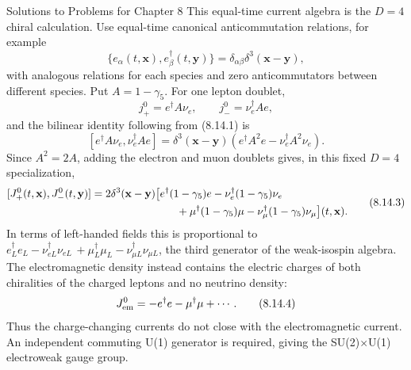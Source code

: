 \begin{bankssolutions}{Solutions to Problems for Chapter 8}
This equal-time current algebra is the $D=4$ chiral calculation.
Use equal-time canonical anticommutation relations, for example
\[
  \{e_\alpha(t,\mathbf x),e_\beta^\dagger(t,\mathbf y)\}
  =\delta_{\alpha\beta}\delta^3(\mathbf x-\mathbf y),
  \tag{8.14.1}
\]
with analogous relations for each species and zero anticommutators between
different species.  Put $A=1-\gamma_5$.  For one lepton doublet,
\[
  j_+^0=e^\dagger A\nu_e,\qquad j_-^0=\nu_e^\dagger A e,
\]
and the bilinear identity following from (8.14.1) is
\[
  [e^\dagger A\nu_e,\nu_e^\dagger A e]
  =\delta^3(\mathbf x-\mathbf y)
  \left(e^\dagger A^2e-\nu_e^\dagger A^2\nu_e\right).
  \tag{8.14.2}
\]
Since $A^2=2A$, adding the electron and muon doublets gives, in this fixed
$D=4$ specialization,
\[
\begin{split}
  [J_+^0(t,\mathbf x),J_-^0(t,\mathbf y)]
  ={}&2\delta^3(\mathbf x-\mathbf y)\bigl[
  e^\dagger(1-\gamma_5)e-\nu_e^\dagger(1-\gamma_5)\nu_e\\
  &\hspace{6.6em}
  +\mu^\dagger(1-\gamma_5)\mu
  -\nu_\mu^\dagger(1-\gamma_5)\nu_\mu\bigr](t,\mathbf x).
\end{split}
  \tag{8.14.3}
\]
In terms of left-handed fields this is proportional to
$e_L^\dagger e_L-\nu_{eL}^\dagger\nu_{eL}\,+\mu_L^\dagger\mu_L-
\nu_{\mu L}^\dagger\nu_{\mu L}$, the third generator of
the weak-isospin algebra.  The electromagnetic density instead contains the
electric charges of both chiralities of the charged leptons and no neutrino
density:
\[
  J_{\rm em}^0=-e^\dagger e-\mu^\dagger\mu+\cdots .
  \tag{8.14.4}
\]
Thus the charge-changing currents do not close with the electromagnetic
current.  An independent commuting U(1) generator is required, giving the
SU(2)$\times$U(1) electroweak gauge group.


\end{bankssolutions}
